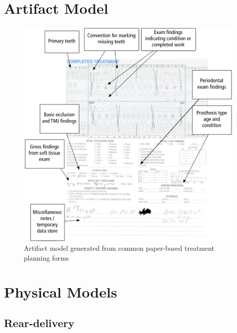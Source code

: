 \documentclass[11pt]{article}
\begin{document}
\newpage

\section{Artifact Model}
\label{artifact}
\begin{figure}[h!b]
\begin{center}
\includegraphics[width=\textwidth]{artifactmodel.png}
\end{center}
\caption{Artifact model generated from common paper-based treatment planning forms}
\end{figure}
\newpage

\section{Physical Models}
\label{physical}
\subsection{Rear-delivery}
\end{document}
